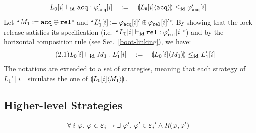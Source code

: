 $$\ltyp{L_0[i]}{\id}{\codeinmath{acq}}{\strat{\codeinmath{acq}}'[i]}
\quad := \quad  \ssem{\codeinmath{acq}}{L_0[i]}\le_\id \strat{\codeinmath{acq}}'[i]$$
Let ``$M_1:= \codeinmath{acq} \oplus \codeinmath{rel}$''
and ``$L_1'[i]:= \strat{\codeinmath{acq}}[i]'\oplus \strat{\codeinmath{rel}}[i]'$''. By showing that the lock release    satisfies its specification
(i.e.\, ``$\ltyp{L_0[i]}{\id}{\codeinmath{rel}}{\strat{\codeinmath{rel}}'[i]}$'')
and by the horizontal composition rule (see Sec.~\ref{boot-linking}), we have:
\begin{equation} \label{eq:acq} \tag{2.1}
\ltyp{L_0[i]}{\id}{M_1}{L_1'[i]}\quad:=\quad \ssem{M_1}{L_0[i]}\le_\id L_1'[i]
\end{equation}
The notations are extended to a set of strategies,  meaning that each strategy of $L_1'[i]$ simulates the one of $\ssem{M_1}{L_0[i]}$. 

\subsection{Higher-level Strategies}


$$\forall \ i \ \strat{} .\ \strat{} \in \oracle_{i} \rightarrow \exists \ \strat{}' . \ \strat{}' \in \oracle_{i}' \wedge R(\strat{}, \strat{}')$$


